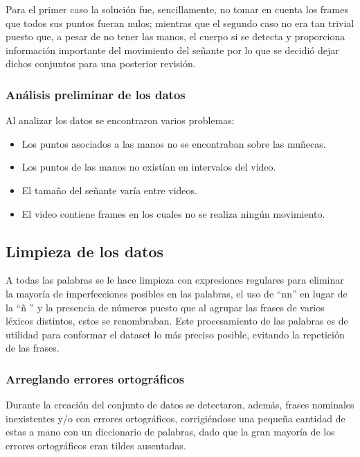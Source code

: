 Para el primer caso la solución fue, sencillamente, no tomar en cuenta los frames que todos sus puntos fueran nulos; mientras que el segundo caso no era tan trivial puesto que, a pesar de no tener las manos, el cuerpo si se detecta y proporciona información importante del movimiento del señante por lo que se decidió dejar dichos conjuntos para una posterior revisión.

\subsubsection{Análisis preliminar de los datos}

Al analizar los datos se encontraron varios problemas:
\begin{itemize}
	\item Los puntos asociados a las manos no se encontraban sobre las muñecas.
	\item Los puntos de las manos no existían en intervalos del video.
	\item El tamaño del señante varía entre videos.
	\item El video contiene frames en los cuales no se realiza ningún movimiento.
\end{itemize}

\subsection{Limpieza de los datos}

 A todas las palabras se le hace limpieza con expresiones regulares para eliminar la mayoría de imperfecciones posibles en las palabras, el uso de ``nn'' en lugar de la ``ñ '' y la presencia de números puesto que al agrupar las frases de varios léxicos distintos, estos se renombraban. Este procesamiento de las palabras es de utilidad para conformar el dataset lo más preciso posible, evitando la repetición de las frases.
 
\subsubsection{Arreglando errores ortográficos}

Durante la creación del conjunto de datos se detectaron, además, frases nominales inexistentes y/o con errores ortográficos, corrigiéndose una pequeña cantidad de estas a mano con un diccionario de palabras, dado que la gran mayoría de los errores ortográficos eran tildes ausentadas.

